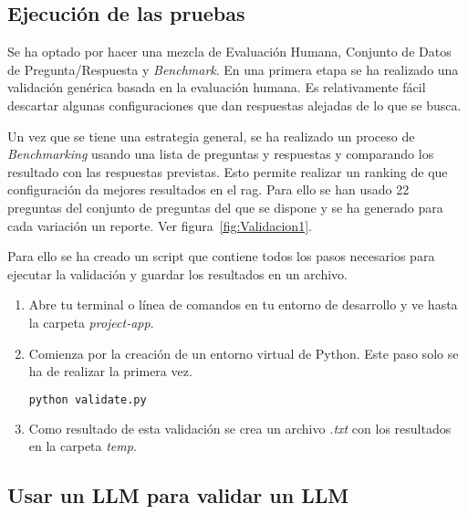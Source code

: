 \subsection{Ejecución de las pruebas}

Se ha optado por hacer una mezcla de Evaluación Humana, Conjunto de Datos de Pregunta/Respuesta y \textit{Benchmark}. En una primera etapa se ha realizado una validación genérica basada en la evaluación humana. Es relativamente fácil descartar algunas configuraciones que dan respuestas alejadas de lo que se busca.

Un vez que se tiene una estrategia general, se ha realizado un proceso de \textit{Benchmarking} usando una lista de preguntas y respuestas y comparando los resultado con las respuestas previstas. Esto permite realizar un ranking de que configuración da mejores resultados en el \acrshort{rag}. Para ello se han usado 22 preguntas del conjunto de preguntas del que se dispone y se ha generado para cada variación un reporte. Ver figura~\ref{fig:Validacion1}.


Para ello se ha creado un script que contiene todos los pasos necesarios para ejecutar la validación y guardar los resultados en un archivo.

\begin{enumerate}
\item Abre tu terminal o línea de comandos en tu entorno de desarrollo y ve hasta la carpeta \textit{project-app}.

\item Comienza por la creación de un entorno virtual de Python. Este paso solo se ha de realizar la primera vez.

\begin{lstlisting}[language=Python, caption=actualización de \textit{requirements.txt}.]
    python validate.py
\end{lstlisting}

\item Como resultado de esta validación se crea un archivo \textit{.txt} con los resultados en la carpeta \textit{temp}.
\end{enumerate}

\subsection{Usar un LLM para validar un LLM}

